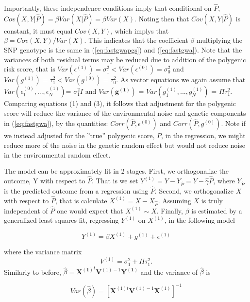 \documentclass[10pt]{article}
\begin{document}
Importantly, these independence conditions imply that conditional on $\hat{P}$, $Cov(X,Y|\hat{P})=\beta Var(X|\hat{P}) = \beta Var(X)$.  Noting then that $Cov(X,Y|\hat{P})$ is constant, it must equal $Cov(X,Y)$, which implys that $\beta =  Cov(X, Y)/Var(X)$.  This indicates that the coefficient $\beta$ multiplying the SNP genotype is the same in (\ref{eq:fastgwapgs}) and (\ref{eq:fastgwa}).   Note that the variances of both residual terms may be reduced due to addition of the polygenic risk score, that is $Var(\epsilon^{(1)}) = \sigma_{1}^2 < Var(\epsilon^{(0)})= \sigma_{0}^2$ and $Var(g^{(1)}) = \tau_{1}^2 < Var(g^{(0)}) = \tau_{0}^2$.  As vector equations we again assume that $Var(\epsilon^{(0)}_{1},...,\epsilon^{(1)}_{N})$= $\sigma_{1}^2 I$ and $Var(\mathbf{g^{(1)}})$ = $Var(g^{(1)}_{1},...,g^{(1)}_{N})$ = $\Pi \tau_1^2$.  
Comparing equations (1) and (3), it follows that adjustment for the polygenic score will reduce the variance of the environmental noise and genetic components in (\ref{eq:fastgwa}), by the quantities: $Corr(\hat{P}, \epsilon^{(0)})$ and $Corr(\hat{P},g^{(0)})$.  Note if we instead adjusted for the ''true'' polygenic score, $P$, in the regression, we might reduce more of the noise in the genetic random effect but would not reduce noise in the environmental random effect.

   The model can be approximately fit in 2 stages.  First, we orthogonalize the outcome, Y with respect to $\hat{P}$.  That is we set $Y^{(1)} = Y - Y_{\hat{P}} = Y - \hat{\gamma} \hat{P}$, where $Y_{\hat{P}}$ is the predicted outcome from a regression using $\hat{P}$.  Second, we orthogonalize $X$ with respect to $\hat{P}$, that is calculate $X^{(1)} = X - X_{\hat{P}}$.  Assuming $X$ is truly independent of $\hat{P}$ one would expect that $X^{(1)} \sim X$.  Finally, $\beta$ is estimated by a generalized least squares fit, regressing $Y^{(1)}$ on $X^{(1)}$, in the following model

\begin{equation}
Y^{(1)} = \beta X^{(1)} + g^{(1)} + \epsilon^{(1)} \label{eq:fastgwapgs_reduced}
\end{equation}

where the variance matrix
 \begin{equation}
 V^{(1)}=\sigma_1^2+ \Pi \tau_1^2.   \label{eq:v_fastgwapgs}
 \end{equation}
Similarly to before, $\hat{\beta} = \mathbf{X^{(1)}}^t \mathbf{V}^{(1)-1} \mathbf{Y^{(1)}}$ and the variance of $\hat{\beta}$ is
 
 \begin{equation}
Var(\hat{\beta})= [\mathbf{X}^{(1)t} \mathbf{V}^{(1)-1} \mathbf{X}^{(1)}]^{-1} \label{eq:var_fastgwapgs}
\end{equation}
\end{document}
